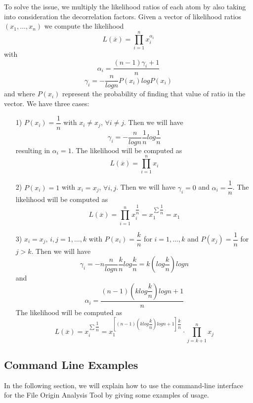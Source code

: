 To solve the issue, we multiply the likelihood ratios of each atom by also taking into consideration the decorrelation factors.
Given a vector of likelihood ratios $(x_{1},\ldots,x_{n})$ we compute the likelihood $$ L(\overline{x}) = \prod\limits_{i=1}^{n} x_{i}^{\alpha_{i}} $$ with $$ \alpha_{i} = \dfrac{(n-1)\gamma_{i}+1}{n} $$ $$ \gamma_{i} = - \dfrac{n}{log n} P(x_{i})log P(x_{i}) $$ and where $P(x_{i})$ represent the probability of finding that value of ratio in the vector.
We have three cases:

\begin{itemize}

\item[1)] $P(x_{i}) = \dfrac{1}{n} $ with $x_{i} \neq x_{j}$, $ \forall i \neq j $.
Then we will have $$ \gamma_{i} = - \dfrac{n}{log n} \dfrac{1}{n} log\dfrac{1}{n} $$ resulting in $\alpha_{i} = 1$.
The likelihood will be computed as $$L(\overline{x}) = \prod\limits_{i=1}^{n} x_{i} $$

\item[2)] $P(x_{i}) = 1 $ with $x_{i} = x_{j}$, $ \forall i,j $.
Then we will have $ \gamma_{i} = 0 $ and $\alpha_{i} = \dfrac{1}{n} $.
The likelihood will be computed as $$L(\overline{x}) = \prod\limits_{i=1}^{n} x_{i}^{\dfrac{1}{n}} = x_{1}^{\sum \dfrac{1}{n}} = x_{1} $$

\item[3)]  $x_{i} = x_{j}$, $ i,j = 1,\ldots,k $ with $P(x_{i}) = \dfrac{k}{n} $ for $i = 1,\ldots,k$ and $P(x_{j}) = \dfrac{1}{n}$ for $j > k$.
Then we will have $$ \gamma_{i} = -n \dfrac{n}{log n} \dfrac{k}{n} log \dfrac{k}{n} = k (log \dfrac{k}{n})log n $$ and 
$$ \alpha_{i} = \dfrac{(n-1)(k log \dfrac{k}{n})log n + 1}{n} $$
The likelihood will be computed as $$L(\overline{x}) = x_{i}^{\sum \dfrac{1}{n}} = x_{1}^{\left[ (n-1)(k log \dfrac{k}{n})log n + 1 \right] \dfrac{k}{n}} \cdot \prod\limits_{j=k+1}^{n} x_{j}  $$

\end{itemize}

\subsection{Command Line Examples}


In the following section, we will explain how to use the command-line interface for the File Origin Analysis Tool by giving some examples of usage.

